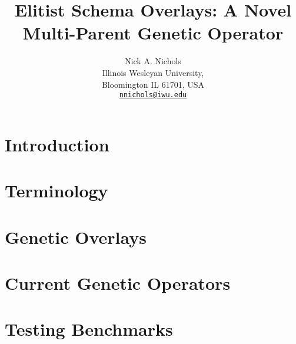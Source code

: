 \documentclass{article}
\makeatletter
\def \papertitle {Elitist Schema Overlays: A Novel Multi-Parent Genetic Operator}
\def \paperauthors {Nick A. Nichols}
\def \paperinstitute {\small Illinois Wesleyan University, \\ \small Bloomington IL 61701, USA}
\def \paperemails {\small\href{mailto:nnichols@iwu.edu}{\nolinkurl{nnichols@iwu.edu}}}
\makeatother
\begin{document}
\title{\papertitle}
\author{\paperauthors \\ \paperinstitute \\ \paperemails}

\maketitle


\begin{abstract}

\end{abstract}








\section{Introduction} 
\label{sec:introduction}



\section{Terminology} 
\label{sec:terminology}



\section{Genetic Overlays}
\label{sec:overlays}



\section{Current Genetic Operators}
\label{sec:current}



\section{Testing Benchmarks}
\label{sec:testfunctions}

\end{document}
